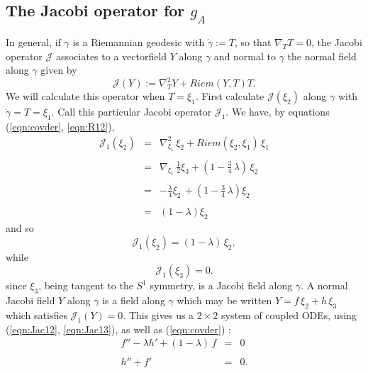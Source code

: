 \documentclass[12pt,reqno]{amsart}\usepackage{amssymb,amsmath,amscd,epsfig,amsthm,enumerate,import,eufrak}
\theoremstyle{definition}
\theoremstyle{remark}
\numberwithin{equation}{section}
\theoremstyle{plain}
\theoremstyle{definition}
\def \vs {\vskip 2mm}
\theoremstyle{remark}
\numberwithin{theorem}{section}
\begin{document}
\subsection{The Jacobi operator for $g_A$} \label{sub:JacA} In general, if $\gamma$ is a Riemannian geodesic with $\dot{\gamma} := T$, so that $\nabla_T T = 0$, the Jacobi operator $\mathcal{J}$ associates to a vectorfield $Y$ along $\gamma$ and normal to $\gamma$ the normal field along $\gamma$ given by
%
\[
	\mathcal{J}(Y) := \nabla_T^2 Y + Riem(Y, T) T.
\]
%
We will calculate this operator when $T = \xi_1$. 
%
First calculate $\mathcal{J}(\xi_2)$ along $\gamma$ with $\dot{\gamma} = T = \xi_1$.
Call this particular Jacobi operator $\mathcal{J}_1$. 
%
%
%
%
%
%
%
%
%
%
We have, by equations (\ref{eqn:covder}, \ref{eqn:R12}), 
%
\[
	\begin{array}{rcl}
		\mathcal{J}_1(\xi_2) & = & \nabla_{\xi_1}^2 \, \xi_2 + Riem(\xi_2, \xi_1) \, \xi_1 \\
			& & \\
			& = & \nabla_{\xi_1} \, \frac12 \xi_3 + (1 -\frac34 \, \lambda) \, \xi_2 \\
			&	&	\\
			& = & - \frac{\lambda}4 \xi_2\, + (1- \frac34 \, \lambda) \xi_2 \\
			&	&	\\
			& = & (1 - \lambda) \xi_2
	\end{array}
\]
%
and so
\begin{equation} \label{eqn:Jac12}
	\mathcal{J}_1(\xi_2) =  (1 - \lambda) \, \xi_2,
\end{equation}
%
while
%
\begin{equation}\label{eqn:Jac13}
	\mathcal{J}_1(\xi_3) = 0.
\end{equation}
%
since $\xi_3$, being tangent to the $S^1$ symmetry, is a Jacobi field along $\gamma$.
%
%
\vs\vs
A normal Jacobi field $Y$ along $\gamma$ is a field along $\gamma$ which may be written $Y =f\, \xi_2 + h \,\xi_3$ which satisfies $\mathcal{J}_1(Y) = 0$. This gives us a $2 \times 2$ system of coupled ODEs, using (\ref{eqn:Jac12}, \ref{eqn:Jac13}), as well as (\ref{eqn:covder}) :
%
%
\vs
%
\begin{equation} \label{eqn:Jac1sys}
	\begin{array}{rcl}
		f'' - \lambda h' + (1 - \lambda) \, f & = & 0 \\
			&	&	\\
		h'' + f'  & = & 0.
	\end{array}
\end{equation}
\end{document}
